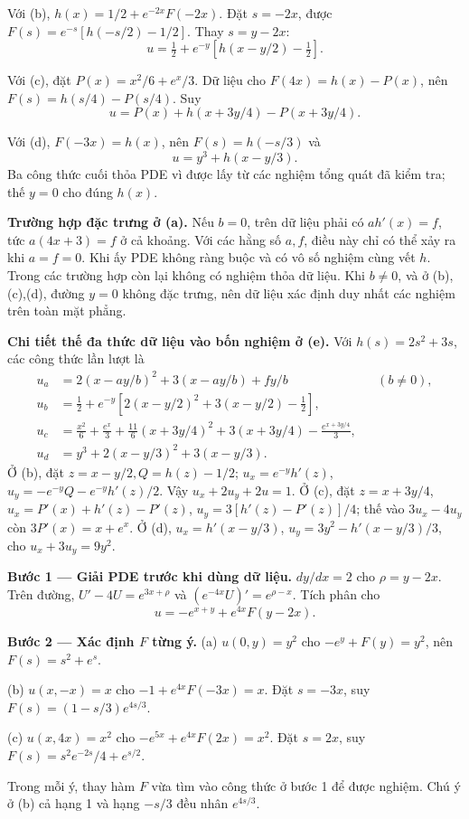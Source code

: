 Với (b), $h(x)=1/2+e^{-2x}F(-2x)$. Đặt $s=-2x$, được $F(s)=e^{-s}[h(-s/2)-1/2]$. Thay $s=y-2x$:
\[u=\tfrac12+e^{-y}[h(x-y/2)-\tfrac12].\]

Với (c), đặt $P(x)=x^2/6+e^x/3$. Dữ liệu cho $F(4x)=h(x)-P(x)$, nên $F(s)=h(s/4)-P(s/4)$. Suy
\[u=P(x)+h(x+3y/4)-P(x+3y/4).\]

Với (d), $F(-3x)=h(x)$, nên $F(s)=h(-s/3)$ và
\[u=y^3+h(x-y/3).\]
Ba công thức cuối thỏa PDE vì được lấy từ các nghiệm tổng quát đã kiểm tra; thế $y=0$ cho đúng $h(x)$.

\textbf{Trường hợp đặc trưng ở (a).} Nếu $b=0$, trên dữ liệu phải có $ah'(x)=f$, tức $a(4x+3)=f$ ở cả khoảng. Với các hằng số $a,f$, điều này chỉ có thể xảy ra khi $a=f=0$. Khi ấy PDE không ràng buộc và có vô số nghiệm cùng vết $h$. Trong các trường hợp còn lại không có nghiệm thỏa dữ liệu. Khi $b\ne0$, và ở (b),(c),(d), đường $y=0$ không đặc trưng, nên dữ liệu xác định duy nhất các nghiệm trên toàn mặt phẳng.

\textbf{Chi tiết thế đa thức dữ liệu vào bốn nghiệm ở (e).} Với $h(s)=2s^2+3s$, các công thức lần lượt là
\[\begin{aligned}
u_a&=2(x-ay/b)^2+3(x-ay/b)+fy/b &&(b\ne0),\\
u_b&=\tfrac12+e^{-y}[2(x-y/2)^2+3(x-y/2)-\tfrac12],\\
u_c&=\frac{x^2}{6}+\frac{e^x}{3}+\frac{11}{6}(x+3y/4)^2+3(x+3y/4)-\frac{e^{x+3y/4}}3,\\
u_d&=y^3+2(x-y/3)^2+3(x-y/3).
\end{aligned}\]
Ở (b), đặt $z=x-y/2,Q=h(z)-1/2$; $u_x=e^{-y}h'(z)$, $u_y=-e^{-y}Q-e^{-y}h'(z)/2$. Vậy $u_x+2u_y+2u=1$. Ở (c), đặt $z=x+3y/4$, $u_x=P'(x)+h'(z)-P'(z)$, $u_y=3[h'(z)-P'(z)]/4$; thế vào $3u_x-4u_y$ còn $3P'(x)=x+e^x$. Ở (d), $u_x=h'(x-y/3)$, $u_y=3y^2-h'(x-y/3)/3$, cho $u_x+3u_y=9y^2$.

\textbf{Bước 1 — Giải PDE trước khi dùng dữ liệu.} $dy/dx=2$ cho $\rho=y-2x$. Trên đường, $U'-4U=e^{3x+\rho}$ và $(e^{-4x}U)'=e^{\rho-x}$. Tích phân cho
\[u=-e^{x+y}+e^{4x}F(y-2x).\]

\textbf{Bước 2 — Xác định $F$ từng ý.}
(a) $u(0,y)=y^2$ cho $-e^y+F(y)=y^2$, nên $F(s)=s^2+e^s$.

(b) $u(x,-x)=x$ cho $-1+e^{4x}F(-3x)=x$. Đặt $s=-3x$, suy $F(s)=(1-s/3)e^{4s/3}$.

(c) $u(x,4x)=x^2$ cho $-e^{5x}+e^{4x}F(2x)=x^2$. Đặt $s=2x$, suy $F(s)=s^2e^{-2s}/4+e^{s/2}$.

Trong mỗi ý, thay hàm $F$ vừa tìm vào công thức ở bước 1 để được nghiệm. Chú ý ở (b) cả hạng 1 và hạng $-s/3$ đều nhân $e^{4s/3}$.

